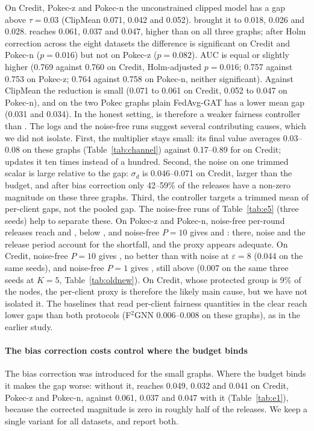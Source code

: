 On Credit, Pokec-z and Pokec-n the unconstrained clipped model has a gap above $\tau=0.03$ (ClipMean 0.071, 0.042 and 0.052). \clamp{} brought it to 0.018, 0.026 and 0.028. \rt{} reaches 0.061, 0.037 and 0.047, higher than \clamp{} on all three graphs; after Holm correction across the eight datasets the difference is significant on Credit and Pokec-n ($p=0.016$) but not on Pokec-z ($p=0.082$). AUC is equal or slightly higher (0.769 against 0.760 on Credit, Holm-adjusted $p=0.016$; 0.757 against 0.753 on Pokec-z; 0.764 against 0.758 on Pokec-n, neither significant). Against ClipMean the reduction is small (0.071 to 0.061 on Credit, 0.052 to 0.047 on Pokec-n), and on the two Pokec graphs plain FedAvg-GAT has a lower mean gap (0.031 and 0.034). In the honest setting, \rt{} is therefore a weaker fairness controller than \clamp{}. The logs and the noise-free runs suggest several contributing causes, which we did not isolate. First, the multiplier stays small: its final value averages 0.03--0.08 on these graphs (Table~\ref{tab:channel}) against 0.17--0.89 for \clamp{} on Credit; \rt{} updates it ten times instead of a hundred. Second, the noise on one trimmed scalar is large relative to the gap: $\sigma_d$ is 0.046--0.071 on Credit, larger than the budget, and after bias correction only 42--59\% of the releases have a non-zero magnitude on these three graphs. Third, the controller targets a trimmed mean of per-client gaps, not the pooled gap. The noise-free runs of Table~\ref{tab:e5} (three seeds) help to separate these. On Pokec-z and Pokec-n, noise-free per-round releases reach \nfPokeczPone{} and \nfPokecnPone{}, below \clamp{}, and noise-free $P=10$ gives \nfPokeczPten{} and \nfPokecnPten{}: there, noise and the release period account for the shortfall, and the proxy appears adequate. On Credit, noise-free $P=10$ gives \nfCreditPten{}, no better than with noise at $\varepsilon=8$ (0.044 on the same seeds), and noise-free $P=1$ gives \nfCreditPone{}, still above \clamp{} (0.007 on the same three seeds at $K=5$, Table~\ref{tab:oldnew}). On Credit, whose protected group is 9\% of the nodes, the per-client proxy is therefore the likely main cause, but we have not isolated it. The baselines that read per-client fairness quantities in the clear reach lower gaps than both protocols (F$^2$GNN 0.006--0.008 on these graphs), as in the earlier study.

\paragraph{The bias correction costs control where the budget binds}
The bias correction was introduced for the small graphs. Where the budget binds it makes the gap worse: without it, \rt{} reaches 0.049, 0.032 and 0.041 on Credit, Pokec-z and Pokec-n, against 0.061, 0.037 and 0.047 with it (Table~\ref{tab:e1}), because the corrected magnitude is zero in roughly half of the releases. We keep a single variant for all datasets, and report both.

